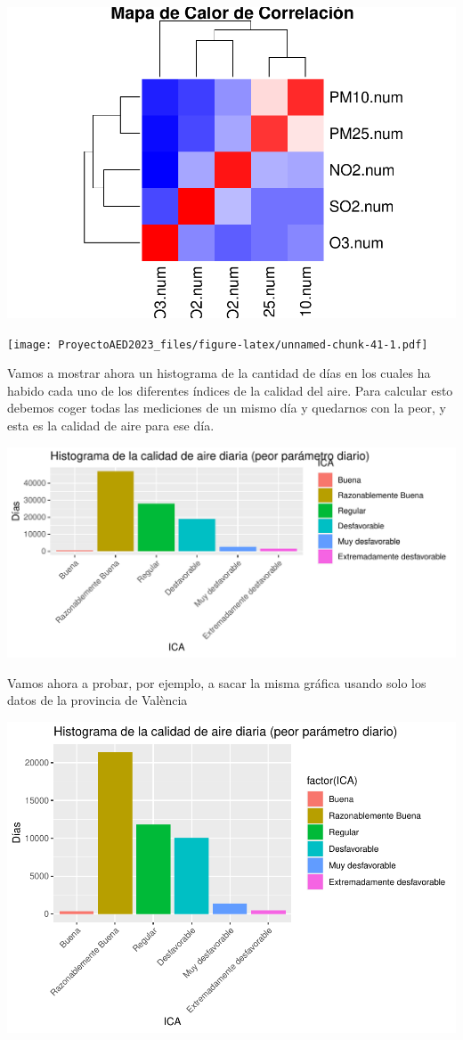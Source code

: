 \documentclass[notspecified,article,submit,moreauthors,pdftex]{Definitions/mdpi}
\begin{document}
\includegraphics{ProyectoAED2023_files/figure-latex/unnamed-chunk-40-1.pdf}

\texttt{[image: ProyectoAED2023\_files/figure-latex/unnamed-chunk-41-1.pdf]}

Vamos a mostrar ahora un histograma de la cantidad de días en los cuales
ha habido cada uno de los diferentes índices de la calidad del aire.
Para calcular esto debemos coger todas las mediciones de un mismo día y
quedarnos con la peor, y esta es la calidad de aire para ese día.

\begin{center}\includegraphics{ProyectoAED2023_files/figure-latex/unnamed-chunk-44-1} \end{center}

Vamos ahora a probar, por ejemplo, a sacar la misma gráfica usando solo
los datos de la provincia de València

\includegraphics{ProyectoAED2023_files/figure-latex/unnamed-chunk-45-1.pdf}
\end{document}
